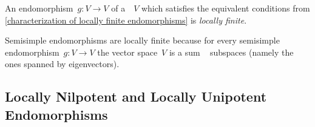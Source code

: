 \begin{definition}
  An endomorphism~$g \colon V \to V$ of a~~$V$ which satisfies the equivalent conditions from \cref{characterization of locally finite endomorphisms} is \emph{locally finite}.
\end{definition}


% 
% 
%   
% 
% 
% 
% 


\begin{example}
  Semisimple endomorphisms are locally finite because for every semisimple endomorphism~$g \colon V \to V$ the vector space~$V$ is a sum ~ subspaces (namely the ones spanned by eigenvectors).
\end{example}





\subsection{Locally Nilpotent and Locally Unipotent Endomorphisms}


